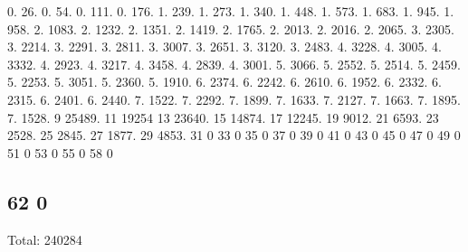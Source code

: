 0. 26. 0. 54. 0. 111. 0. 176. 1. 239. 1. 273. 1. 340. 1. 448. 1. 573. 1. 683. 1. 945. 1. 958. 2. 1083. 2. 1232. 2. 1351. 2. 1419. 2. 1765. 2. 2013. 2. 2016. 2. 2065. 3. 2305. 3. 2214. 3. 2291. 3. 2811. 3. 3007. 3. 2651. 3. 3120. 3. 2483. 4. 3228. 4. 3005. 4. 3332. 4. 2923. 4. 3217. 4. 3458. 4. 2839. 4. 3001. 5. 3066. 5. 2552. 5. 2514. 5. 2459. 5. 2253. 5. 3051. 5. 2360. 5. 1910. 6. 2374. 6. 2242. 6. 2610. 6. 1952. 6. 2332. 6. 2315. 6. 2401. 6. 2440. 7. 1522. 7. 2292. 7. 1899. 7. 1633. 7. 2127. 7. 1663. 7. 1895. 7. 1528. 9 25489. 11 19254 13 23640. 15 14874. 17 12245. 19 9012. 21 6593. 23 2528. 25 2845. 27 1877. 29 4853. 31 0 33 0 35 0 37 0 39 0 41 0 43 0 45 0 47 0 49 0 51 0 53 0 55 0 58 0 \subsection*{62 0 }

Total\+: 240284 